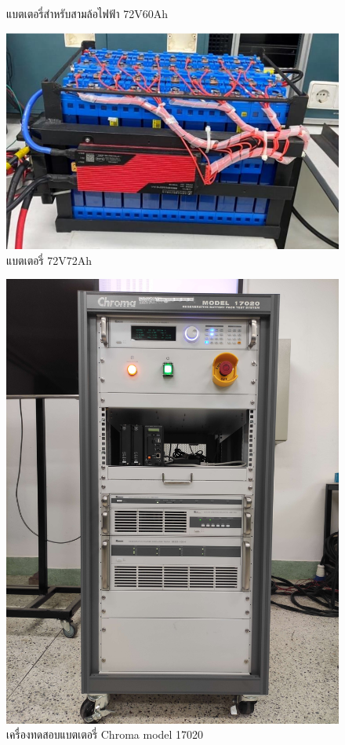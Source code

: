 \begin{center}
\begin{figure}[H]
		\caption{แบตเตอรี่สำหรับสามล้อไฟฟ้า 72V60Ah}
	\end{figure}
	\begin{figure}[H]
		\includegraphics[width=0.5\linewidth]{Chapters/img/Battery_72V72Ah.jpg}
		\centering
		\captionsetup{justification=centering,margin=2cm}
		\caption{แบตเตอรี่ 72V72Ah}
	\end{figure}
	\begin{figure}[H]
		\includegraphics[width=0.5\linewidth]{Chapters/img/Chroma_17020.jpg}
		\centering
		\captionsetup{justification=centering,margin=2cm}
		\caption{เครื่องทดสอบแบตเตอรี่ Chroma model 17020}
	\end{figure}
\end{center}
